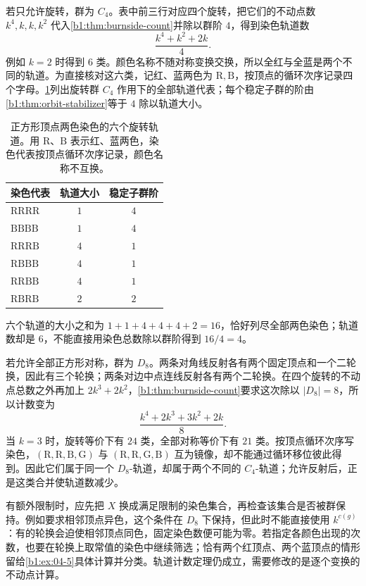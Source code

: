 若只允许旋转，群为 \(C_4\)。表中前三行对应四个旋转，把它们的不动点数 \(k^4,k,k,k^2\) 代入\cref{b1:thm:burnside-count}并除以群阶 \(4\)，得到染色轨道数
\[
	\frac{k^4+k^2+2k}{4}.
\]
例如 \(k=2\) 时得到 \(6\) 类。颜色名称不随对称变换交换，所以全红与全蓝是两个不同的轨道。为直接核对这六类，记红、蓝两色为 \(\mathrm R,\mathrm B\)，按顶点的循环次序记录四个字母。\cref{b1:tab:square-two-color-orbits}列出旋转群 \(C_4\) 作用下的全部轨道代表；每个稳定子群的阶由\cref{b1:thm:orbit-stabilizer}等于 \(4\) 除以轨道大小。

\begin{table}[htbp]
	\centering
	\caption{正方形顶点两色染色的六个旋转轨道。用 \(\mathrm R\)、\(\mathrm B\) 表示红、蓝两色，染色代表按顶点循环次序记录，颜色名称不互换。}
	\label{b1:tab:square-two-color-orbits}
	\begin{tabular}{lcc}
		\toprule
		染色代表 & 轨道大小 & 稳定子群阶 \\
		\midrule
		\(\mathrm{RRRR}\) & \(1\) & \(4\) \\
		\(\mathrm{BBBB}\) & \(1\) & \(4\) \\
		\(\mathrm{RRRB}\) & \(4\) & \(1\) \\
		\(\mathrm{RBBB}\) & \(4\) & \(1\) \\
		\(\mathrm{RRBB}\) & \(4\) & \(1\) \\
		\(\mathrm{RBRB}\) & \(2\) & \(2\) \\
		\bottomrule
	\end{tabular}
\end{table}
六个轨道的大小之和为 \(1+1+4+4+4+2=16\)，恰好列尽全部两色染色；轨道数却是 \(6\)，不能直接用染色总数除以群阶得到 \(16/4=4\)。

\ProseParagraphBreak
若允许全部正方形对称，群为 \(D_8\)。两条对角线反射各有两个固定顶点和一个二轮换，因此有三个轮换；两条对边中点连线反射各有两个二轮换。在四个旋转的不动点总数之外再加上 \(2k^3+2k^2\)，\cref{b1:thm:burnside-count}要求这次除以 \(|D_8|=8\)，所以计数变为
\[
	\frac{k^4+2k^3+3k^2+2k}{8}.
\]
当 \(k=3\) 时，旋转等价下有 \(24\) 类，全部对称等价下有 \(21\) 类。按顶点循环次序写染色，\((\mathrm R,\mathrm R,\mathrm B,\mathrm G)\) 与 \((\mathrm R,\mathrm R,\mathrm G,\mathrm B)\) 互为镜像，却不能通过循环移位彼此得到。因此它们属于同一个 \(D_8\)-轨道，却属于两个不同的 \(C_4\)-轨道；允许反射后，正是这类合并使轨道数减少。

\ProseParagraphBreak
有额外限制时，应先把 \(X\) 换成满足限制的染色集合，再检查该集合是否被群保持。例如要求相邻顶点异色，这个条件在 \(D_8\) 下保持，但此时不能直接使用 \(k^{c(g)}\)：有的轮换会迫使相邻顶点同色，固定染色数便可能为零。若指定各颜色出现的次数，也要在轮换上取常值的染色中继续筛选；恰有两个红顶点、两个蓝顶点的情形留给\cref{b1:ex:04-5}具体计算并分类。轨道计数定理仍成立，需要修改的是逐个变换的不动点计算。

